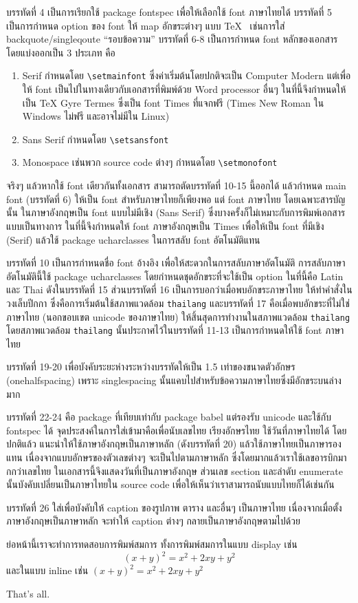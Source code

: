 \documentclass[a4paper,12pt]{article}
\begin{document}
บรรทัดที่ 4 เป็นการเรียกใช้ package fontspec เพื่อให้เลือกใช้ font ภาษาไทยได้
บรรทัดที่ 5 เป็นการกำหนด option ของ font ให้ map อักขระต่างๆ แบบ \TeX~ เช่นการใส่ backquote/singleqoute ``รอบข้อความ'' บรรทัดที่ 6-8 เป็นการกำหนด font หลักของเอกสาร โดยแบ่งออกเป็น 3 ประเภท คือ
\renewcommand{\theenumi}{\arabic{enumi}}
\begin{enumerate}
    \item Serif กำหนดโดย \lstinline|\setmainfont| ซึ่งค่าเริ่มต้นโดยปกติจะเป็น Computer Modern แต่เพื่อให้ font เป็นไปในทางเดียวกับเอกสารที่พิมพ์ด้วย Word processor อื่นๆ ในที่นี้จึงกำหนดให้เป็น TeX Gyre Termes ซึ่งเป็น font Times ที่แจกฟรี (Times New Roman ใน Windows ไม่ฟรี และอาจไม่มีใน Linux)
    \item Sans Serif กำหนดโดย \lstinline|\setsansfont|
    \item Monospace เช่นพวก source code ต่างๆ กำหนดโดย \lstinline|\setmonofont|
\end{enumerate}

จริงๆ แล้วหากใช้ font เดียวกันทั้งเอกสาร สามารถตัดบรรทัดที่ 10-15 นี้ออกได้ แล้วกำหนด main font (บรรทัดที่ 6) ให้เป็น font สำหรับภาษาไทยก็เพียงพอ แต่ font ภาษาไทย โดยเฉพาะสารบัญนั้น ในภาษาอังกฤษเป็น font แบบไม่มีเชิง (Sans Serif) ซึ่งบางครั้งก็ไม่เหมาะกับการพิมพ์เอกสารแบบเป็นทางการ ในที่นี้จึงกำหนดให้ font ภาษาอังกฤษเป็น Times เพื่อให้เป็น font ที่มีเชิง (Serif) แล้วใช้ package ucharclasses ในการสลับ font อัตโนมัติแทน

บรรทัดที่ 10 เป็นการกำหนดชื่อ font อ้างอิง เพื่อให้สะดวกในการสลับภาษาอัตโนมัติ การสลับภาษาอัตโนมัตินี้ใช้ package ucharclasses โดยกำหนดชุดอักขระที่จะใช้เป็น option ในที่นี้คือ Latin และ Thai ดังในบรรทัดที่ 15 ส่วนบรรทัดที่ 16 เป็นการบอกว่าเมื่อพบอักขระภาษาไทย ให้ทำคำสั่งในวงเล็บปีกกา ซึ่งคือการเริ่มต้นใช้สภาพแวดล้อม \lstinline|thailang| และบรรทัดที่ 17 คือเมื่อพบอักขระที่ไม่ใช่ภาษาไทย (นอกขอบเขต unicode ของภาษาไทย) ให้สิ้นสุดการทำงานในสภาพแวดล้อม \lstinline|thailang| โดยสภาพแวดล้อม \lstinline|thailang| นั้นประกาศไว้ในบรรทัดที่ 11-13 เป็นการกำหนดให้ใช้ font ภาษาไทย

บรรทัดที่ 19-20 เพื่อบังคับระยะห่างระหว่างบรรทัดให้เป็น 1.5 เท่าของขนาดตัวอักษร (onehalfspacing) เพราะ singlespacing นั้นแคบไปสำหรับข้อความภาษาไทยซึ่งมีอักขระบนล่างมาก

บรรทัดที่ 22-24 คือ package ที่เทียบเท่ากับ package babel แต่รองรับ unicode และใช้กับ fontspec ได้ จุดประสงค์ในการใส่เข้ามาคือเพื่อนับเลขไทย เรียงอักษรไทย ใช้วันที่ภาษาไทยได้ โดยปกติแล้ว แนะนำให้ใช้ภาษาอังกฤษเป็นภาษาหลัก (ดังบรรทัดที่ 20) แล้วใช้ภาษาไทยเป็นภาษารองแทน  เนื่องจากแบบอักษรของตัวเลขต่างๆ จะเป็นไปตามภาษาหลัก ซึ่งโดยมากแล้วเราใช้เลขอารบิกมากกว่าเลขไทย ในเอกสารนี้จึงแสดงวันที่เป็นภาษาอังกฤษ ส่วนเลข section และลำดับ enumerate นั้นบังคับเปลี่ยนเป็นภาษาไทยใน source code เพื่อให้เห็นว่าเราสามารถนับแบบไทยก็ได้เช่นกัน

บรรทัดที่ 26 ใส่เพื่อบังคับให้ caption ของรูปภาพ ตาราง และอื่นๆ เป็นภาษาไทย เนื่องจากเมื่อตั้งภาษาอังกฤษเป็นภาษาหลัก จะทำให้ caption ต่างๆ กลายเป็นภาษาอังกฤษตามไปด้วย

ย่อหน้านี้เราจะทำการทดสอบการพิมพ์สมการ ทั้งการพิมพ์สมการในแบบ display เช่น $$(x+y)^2 = x^2 + 2xy + y^2$$  และในแบบ inline เช่น $(x+y)^2 = x^2 + 2xy + y^2$ 

That's all.
\end{document}
